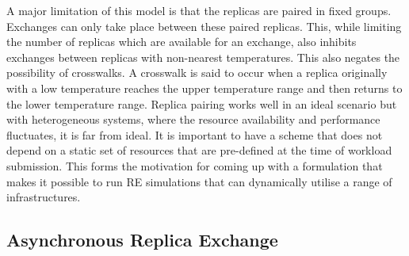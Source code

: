 \documentclass{rspublic}
\newcommand{\jhanote}[1]{ {\textcolor{red} { ***shantenu: #1 }}}
\newcommand{\jhanote}[1]{}
\begin{document}
A major limitation of this model is that the replicas are paired in
fixed groups.  Exchanges can only take place between these paired
replicas.  This, while limiting the number of replicas which are
available for an exchange, also inhibits exchanges between replicas
with non-nearest temperatures. This also negates the possibility of
crosswalks. A crosswalk is said to occur when a replica originally
with a low temperature reaches the upper temperature range and then
returns to the lower temperature
range. %
Replica pairing works well in an ideal scenario but with heterogeneous
systems, where the resource availability and performance fluctuates,
it is far from ideal. It is important to have a scheme that does not
depend on a static  set of
resources that are pre-defined at the time of workload submission.
This forms the motivation for coming up with a formulation that makes
it possible to run RE simulations that can dynamically utilise a range
of infrastructures.



  
\subsection{Asynchronous Replica Exchange}

\end{document}

